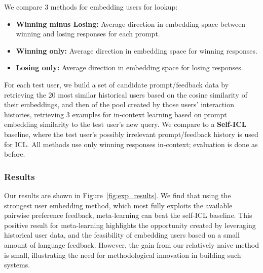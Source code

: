 We compare 3 methods for embedding users for lookup:
\begin{itemize}
    \item \textbf{Winning minus Losing:} Average direction in embedding space between winning and losing responses for each prompt.
    \item \textbf{Winning only:} Average direction in embedding space for winning responses. 
    \item \textbf{Losing only:} Average direction in embedding space for losing responses.
\end{itemize}

For each test user, we build a set of candidate prompt/feedback data by retrieving the 20 most similar historical users based on the cosine similarity of their embeddings, and then of the pool created by those users' interaction histories, retrieving 3 examples for in-context learning based on prompt embedding similarity to the test user's new query.  We compare to a \textbf{Self-ICL} baseline, where the test user's possibly irrelevant prompt/feedback history is used for ICL.  All methods use only winning responses in-context; evaluation is done as before.

\subsubsection{Results}

Our results are shown in Figure~\ref{fig:exp_results}.  
We find that using the strongest user embedding method, which most fully exploits the available pairwise preference feedback, meta-learning can beat the self-ICL baseline.
This positive result for meta-learning highlights the opportunity created by leveraging historical user data, and the feasibility of embedding users based on a small amount of language feedback.
However, the gain from our relatively naive method is small, illustrating the need for methodological innovation in building such systems.

